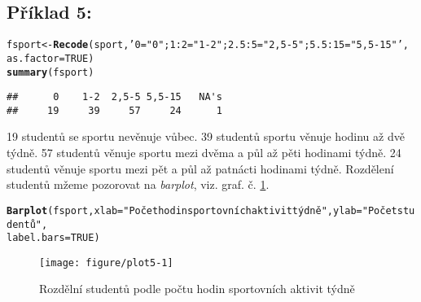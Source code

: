 \documentclass[twoside]{article}\usepackage[]{graphicx}\usepackage[]{color}
\makeatletter
\def\maxwidth{ %
  \ifdim\Gin@nat@width>\linewidth
    \linewidth
  \else
    \Gin@nat@width
  \fi
}
\newcommand{\hlnum}[1]{\textcolor[rgb]{0.686,0.059,0.569}{#1}}%
\newcommand{\hlstr}[1]{\textcolor[rgb]{0.192,0.494,0.8}{#1}}%
\newcommand{\hlstd}[1]{\textcolor[rgb]{0.345,0.345,0.345}{#1}}%
\newcommand{\hlkwb}[1]{\textcolor[rgb]{0.69,0.353,0.396}{#1}}%
\newcommand{\hlkwc}[1]{\textcolor[rgb]{0.333,0.667,0.333}{#1}}%
\newcommand{\hlkwd}[1]{\textcolor[rgb]{0.737,0.353,0.396}{\textbf{#1}}}%
\newenvironment{kframe}{%
 \def\at@end@of@kframe{}%
 \ifinner\ifhmode%
  \def\at@end@of@kframe{\end{minipage}}%
  \begin{minipage}{\columnwidth}%
 \fi\fi%
 \def\FrameCommand##1{\hskip\@totalleftmargin \hskip-\fboxsep
 \colorbox{shadecolor}{##1}\hskip-\fboxsep
     \hskip-\linewidth \hskip-\@totalleftmargin \hskip\columnwidth}%
 \MakeFramed {\advance\hsize-\width
   \@totalleftmargin\z@ \linewidth\hsize
   \@setminipage}}%
 {\par\unskip\endMakeFramed%
 \at@end@of@kframe}
\newenvironment{knitrout}{}{} %
\makeatother
\begin{document}
\subsection*{Příklad 5:}
\begin{knitrout}
\color{fgcolor}\begin{kframe}
\begin{alltt}
\hlstd{fsport} \hlkwb{<-} \hlkwd{Recode}\hlstd{(sport,} \hlstr{'0="0"; 1:2="1-2"; 2.5:5="2,5-5"; 5.5:15="5,5-15"'}\hlstd{,}
    \hlkwc{as.factor}\hlstd{=}\hlnum{TRUE}\hlstd{)}
\hlkwd{summary}\hlstd{(fsport)}
\end{alltt}
\begin{verbatim}
##      0    1-2  2,5-5 5,5-15   NA's 
##     19     39     57     24      1
\end{verbatim}
\end{kframe}
\end{knitrout}

19 studentů se sportu nevěnuje vůbec. 39 studentů sportu věnuje hodinu až dvě týdně. 57 studentů věnuje sportu mezi dvěma a půl až pěti hodinami týdně. 24 studentů věnuje sportu mezi pět a půl až patnácti hodinami týdně. Rozdělení studentů mžeme pozorovat na \emph{barplot}, viz. graf. č. \ref{fig:plot5}.

\begin{knitrout}
\color{fgcolor}\begin{kframe}
\begin{alltt}
\hlkwd{Barplot}\hlstd{(fsport,} \hlkwc{xlab}\hlstd{=}\hlstr{"Počet hodin sportovních aktivit týdně"}\hlstd{,} \hlkwc{ylab}\hlstd{=}\hlstr{"Počet studentů"}\hlstd{,}
    \hlkwc{label.bars}\hlstd{=}\hlnum{TRUE}\hlstd{)}
\end{alltt}
\end{kframe}\begin{figure}[h]
\texttt{[image: figure/plot5-1]} \caption[Rozdělní studentů podle počtu hodin sportovních aktivit týdně]{Rozdělní studentů podle počtu hodin sportovních aktivit týdně}\label{fig:plot5}
\end{figure}


\end{knitrout}

\newpage
\end{document}
